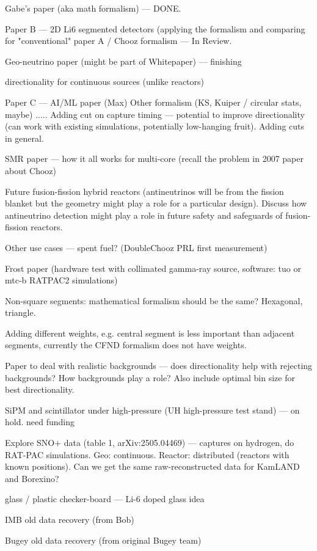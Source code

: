 Gabe's paper (aka math formalism) --- DONE.

Paper B --- 2D Li6 segmented detectors (applying the formalism and comparing for "conventional" paper A / Chooz formalism --- In Review.

Geo-neutrino paper (might be part of Whitepaper) --- finishing

directionality for continuous sources (unlike reactors) 


Paper C --- AI/ML paper (Max)
Other formalism (KS, Kuiper / circular stats, maybe) .....
Adding cut on capture timing --- potential to improve directionality (can work with existing simulations, potentially low-hanging fruit).
Adding cuts in general.

SMR paper --- how it all works for multi-core (recall the problem in 2007 paper about Chooz)

Future fusion-fission hybrid reactors (antineutrinos will be from the fission blanket but the geometry might play a role for a particular design). Discuss how antineutrino detection might play a role in future safety and safeguards of fusion-fission reactors.

Other use cases --- spent fuel? (DoubleChooz PRL first measurement)

Frost paper (hardware test with collimated gamma-ray source, software: tuo or mtc-b RATPAC2 simulations)

Non-square segments: mathematical formalism should be the same? Hexagonal, triangle.

Adding different weights, e.g. central segment is less important than adjacent segments, currently the CFND formalism does not have weights.

Paper to deal with realistic backgrounds --- does directionality help with rejecting backgrounds? How backgrounds play a role? Also include optimal bin size for best directionality.


SiPM and scintillator under high-pressure (UH high-pressure test stand) --- on hold. need funding

Explore SNO+ data (table 1, arXiv:2505.04469) --- captures on hydrogen, do RAT-PAC simulations. 
Geo: continuous. Reactor: distributed (reactors with known positions).
Can we get the same raw-reconstructed data for KamLAND and Borexino?

glass / plastic checker-board --- Li-6 doped glass idea

IMB old data recovery  (from Bob)

Bugey old data recovery (from original Bugey team)

